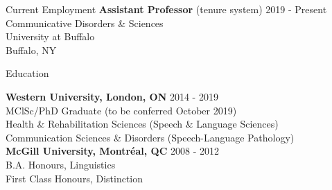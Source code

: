 \documentclass{resume} %
\begin{document}

\begin{rSection}{Current Employment}
{{\bf Assistant Professor} (tenure system)} \hfill {2019 - Present} \\
Communicative Disorders \& Sciences \\
University at Buffalo \\
Buffalo, NY

\end{rSection}

\begin{rSection}{Education}

{\bf Western University, London, ON} \hfill {2014 - 2019} \\ 
MClSc/PhD Graduate (to be conferred October 2019)\\
Health \& Rehabilitation Sciences (Speech \& Language Sciences) \\ 
Communication Sciences \& Disorders (Speech-Language Pathology) \bigskip \\
{\bf McGill University, Montr\'eal, QC} \hfill {2008 - 2012} \\
B.A. Honours, Linguistics \\
First Class Honours, Distinction

\end{rSection}

\end{document}
